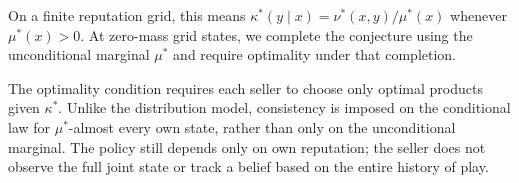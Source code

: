 \documentclass[11pt]{article}
\begin{document}
On a finite reputation grid, this means
$\kappa^*(y\mid x)=\nu^*(x,y)/\mu^*(x)$ whenever $\mu^*(x)>0$.
At zero-mass grid states, we complete the conjecture using
the unconditional marginal $\mu^*$ and require optimality
under that completion.

The optimality condition requires each seller to choose
only optimal products given $\kappa^*$. Unlike the distribution
model, consistency is imposed on the conditional law for
$\mu^*$-almost every own state, rather than only on the
unconditional marginal. The policy still depends only on
own reputation; the seller does not observe the full joint
state or track a belief based on the entire history of play.
\end{document}

